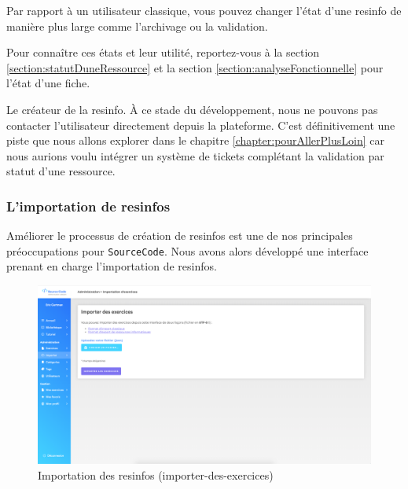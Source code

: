 
Par rapport à un utilisateur classique, vous pouvez changer l'état d'une \gls{resinfo} de manière plus large comme l'archivage ou la validation.

Pour connaître ces états et leur utilité, reportez-vous à la section \ref{section:statutDuneRessource} et la section \ref{section:analyseFonctionnelle} pour l'état d'une \gls{fiche}.


Le créateur de la \gls{resinfo}. À ce stade du développement, nous ne pouvons pas contacter l'utilisateur directement depuis la plateforme. C'est définitivement une piste que nous allons explorer dans le chapitre \ref{chapter:pourAllerPlusLoin} car nous aurions voulu intégrer un système de tickets complétant la validation par statut d'une ressource.\\

\subsubsection{L'importation de \glspl{resinfo}}

Améliorer le processus de création de \glspl{resinfo} est une de nos principales préoccupations pour \texttt{SourceCode}. Nous avons alors développé une interface prenant en charge l'importation de \glspl{resinfo}.

\begin{figure}[H]
    \includegraphics[width=\textwidth,height=\textheight,keepaspectratio]{images/client/import.png}
    \centering
    \caption[SourceCode : importation des \glspl{resinfo}]{Importation des \glspl{resinfo} (importer-des-exercices)}
\end{figure}

